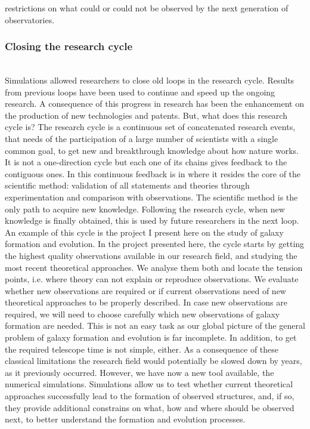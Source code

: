 \documentclass[oneside, a4paper, onecolumn, 11pt]{article}
\begin{document}
restrictions on what could or could not be observed by the next generation of observatories.\\
\subsubsection*{Closing the research cycle}\\
Simulations allowed researchers to close old loops in the research cycle. Results from previous loops have been used to continue and speed up the ongoing research. A consequence of this progress in research has been the enhancement on the production of new technologies and patents. But, what does this research cycle is? The research cycle is a continuous set of concatenated research events, that needs of the participation of a large number of scientists with a single common goal, to get new and breakthrough knowledge about how nature works. It is not a one-direction cycle but each one of its chains gives feedback to the contiguous ones. In this continuous feedback is in where it resides the core of the scientific method: validation of all statements and theories through experimentation and comparison with observations. The scientific method is the only path to acquire new knowledge. Following the research cycle, when new knowledge is finally obtained, this is used by future researchers in the next loop. An example of this cycle is the project I present here on the study of galaxy formation and evolution. In the project presented here, the cycle starts by getting the highest quality observations available in our research field, and studying the most recent theoretical approaches. We analyse them both and locate the tension points, i.e. where theory can not explain or reproduce observations. We evaluate whether new observations are required or if current observations need of new theoretical approaches to be properly described. In case new observations are required, we will need to choose carefully which new observations of galaxy formation are needed. This is not an easy task as our global picture of the general  problem of galaxy formation and evolution is far incomplete. In addition, to get the required telescope time is not simple, either. As a consequence of these classical limitations the research field would potentially be slowed down by years, as it previously occurred. However, we have now a new tool available, the numerical simulations. Simulations allow us to test whether current theoretical approaches successfully lead to the formation of observed structures, and, if so, they provide additional constrains on what, how and where should be observed next, to better understand the formation and evolution processes.
\end{document}
